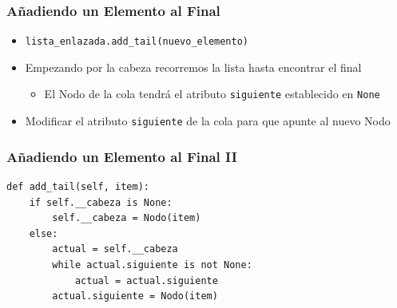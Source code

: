 \documentclass[11pt]{beamer}
\begin{document}
	\begin{frame}
		\frametitle{Añadiendo un Elemento al Final}
		\begin{itemize}
			\item \lstinline|lista_enlazada.add_tail(nuevo_elemento)|
			\item Empezando por la cabeza recorremos la lista hasta encontrar el final
			\begin{itemize}
				\item El Nodo de la cola tendrá el atributo \texttt{siguiente} establecido en \lstinline|None|
			\end{itemize}
			\item Modificar el atributo \texttt{siguiente} de la cola para que apunte al nuevo Nodo
		\end{itemize}
		\vspace{0.7cm}
		\begin{center}
		\end{center}
	\end{frame}

	\begin{frame}[fragile]
		\frametitle{Añadiendo un Elemento al Final II}
\begin{lstlisting}
def add_tail(self, item):
	if self.__cabeza is None:
		self.__cabeza = Nodo(item)
	else:
		actual = self.__cabeza
		while actual.siguiente is not None:
			actual = actual.siguiente
		actual.siguiente = Nodo(item)
\end{lstlisting}
\end{frame}
\end{document}
